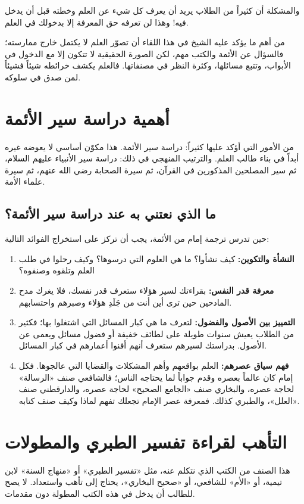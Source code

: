 والمشكلة أن كثيراً من الطلاب يريد أن يعرف كل شيء عن العلم وخطته قبل أن يدخل فيه! وهذا لن تعرفه حق المعرفة إلا بدخولك في العلم.

\begin{fawaid}
من أهم ما يؤكد عليه الشيخ في هذا اللقاء أن تصوّر العلم لا يكتمل خارج ممارسته؛ فالسؤال عن الأئمة والكتب مهم، لكن الصورة الحقيقية لا تتكون إلا مع الدخول في الأبواب، وتتبع مسائلها، وكثرة النظر في مصنفاتها. فالعلم يكشف خرائطه شيئاً فشيئاً لمن صدق في سلوكه.
\end{fawaid}

\section{أهمية دراسة سير الأئمة}
من الأمور التي أؤكد عليها كثيراً: دراسة سير الأئمة. هذا مكوّن أساسي لا يعوضه غيره أبداً في بناء طالب العلم. والترتيب المنهجي في ذلك: دراسة سير الأنبياء عليهم السلام، ثم سير المصلحين المذكورين في القرآن، ثم سيرة الصحابة رضي الله عنهم، ثم سيرة علماء الأمة.

\subsection{ما الذي نعتني به عند دراسة سير الأئمة؟}
حين تدرس ترجمة إمام من الأئمة، يجب أن تركز على استخراج الفوائد التالية:
\begin{enumerate}
    \item \textbf{النشأة والتكوين:} كيف نشأوا؟ ما هي العلوم التي درسوها؟ وكيف رحلوا في طلب العلم وتلقوه وصنفوه؟
    \item \textbf{معرفة قدر النفس:} بقراءتك لسير هؤلاء ستعرف قدر نفسك، فلا يغرك مدح المادحين حين ترى أين أنت من جَلَدِ هؤلاء وصبرهم واحتسابهم.
    \item \textbf{التمييز بين الأصول والفضول:} لتعرف ما هي كبار المسائل التي اشتغلوا بها؛ فكثير من الطلاب يعيش سنوات طويلة على لطائف خفيفة أو فضول مسائل ويعمى عن الأصول. بدراستك لسيرهم ستعرف أنهم أفنوا أعمارهم في كبار المسائل.
    \item \textbf{فهم سياق عصرهم:} العلم بواقعهم وأهم المشكلات والقضايا التي عالجوها. فكل إمام كان عالماً بعصره وقدم جواباً لما يحتاجه الناس؛ فالشافعي صنف «الرسالة» لحاجة عصره، والبخاري صنف «الجامع الصحيح» لحاجة عصره، والدارقطني صنف «العلل»، والطبري كذلك. فمعرفة عصر الإمام تجعلك تفهم لماذا وكيف صنف كتابه.
\end{enumerate}

\separator

\section{التأهب لقراءة تفسير الطبري والمطولات}
هذا الصنف من الكتب الذي نتكلم عنه، مثل «تفسير الطبري» أو «منهاج السنة» لابن تيمية، أو «الأم» للشافعي، أو «صحيح البخاري»، يحتاج إلى تأهب واستعداد. لا يصح للطالب أن يدخل في هذه الكتب المطولة دون مقدمات.

